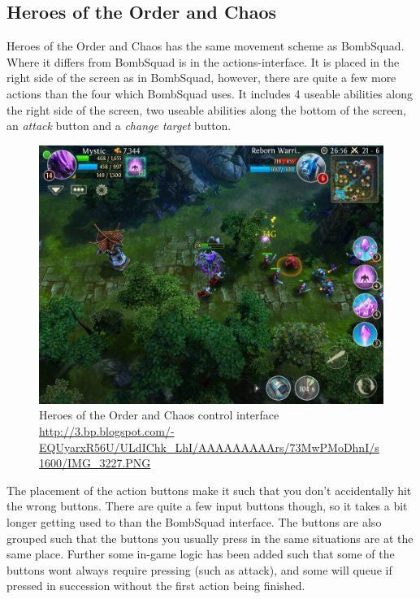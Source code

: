 \subsection*{Heroes of the Order and Chaos}\label{sec:modules:controlscheme:hoftoac}
Heroes of the Order and Chaos has the same movement scheme as BombSquad. 
Where it differs from BombSquad is in the actions-interface.
It is placed in the right side of the screen as in BombSquad, however, there are quite a few more actions than the four which BombSquad uses.
It includes 4 useable abilities along the right side of the screen, two useable abilities along the bottom of the screen, an \emph{attack} button and a \emph{change target} button.
\begin{figure}[H]
\centering
\includegraphics[width=1\textwidth]{figures/controlscheme/hotoac_control}
\caption{Heroes of the Order and Chaos control interface \url{http://3.bp.blogspot.com/-EQUyarxR56U/ULdIChk_LhI/AAAAAAAAArs/73MwPMoDhnI/s1600/IMG_3227.PNG}}
\end{figure}

The placement of the action buttons make it such that you don't accidentally hit the wrong buttons. 
There are quite a few input buttons though, so it takes a bit longer getting used to than the BombSquad interface. 
The buttons are also grouped such that the buttons you usually press in the same situations are at the same place. 
Further some in-game logic has been added such that some of the buttons wont always require pressing (such as attack), and some will queue if pressed in succession without the first action being finished.

